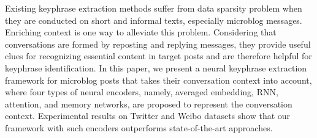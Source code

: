 Existing keyphrase extraction methods suffer from data sparsity problem when they are conducted on short and informal texts, especially microblog messages. Enriching context is one way to alleviate this problem. Considering that conversations are formed by reposting and replying messages, they provide useful clues for recognizing essential content in target posts and are therefore helpful for keyphrase identification. In this paper, we present a neural keyphrase extraction framework for microblog posts that takes their conversation context into account, where four types of neural encoders, namely, averaged embedding, RNN, attention, and memory networks, are proposed to represent the conversation context. Experimental results on Twitter and Weibo datasets show that our framework with such encoders outperforms state-of-the-art approaches.
